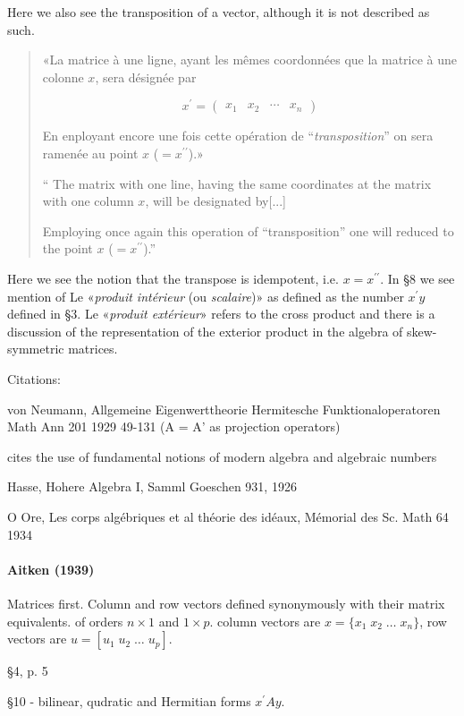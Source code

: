Here we also see the transposition of a vector, although it is not described as such.
\begin{quote}
«La matrice à une ligne, ayant les mêmes coordonnées que la matrice à une colonne $x$, sera désignée par

\[
x^\prime = \begin{pmatrix}x_1 & x_2 & \cdots & x_n\end{pmatrix}
\]

En enployant encore une fois cette opération de ``\textit{transposition}'' on sera ramenée au point $x$ ($= x^{\prime\prime}$).»

``
The matrix with one line, having the same coordinates at the matrix with one column $x$, will be designated by[...]

Employing once again this operation of ``transposition'' one will reduced to the point $x$ ($= x^{\prime\prime}$).''

\end{quote}
Here we see the notion that the transpose is idempotent, i.e. $x = x^{\prime\prime}$.
In \S 8 we see mention of Le «\textit{produit intérieur} (ou \textit{scalaire})» as defined as the number $x^\prime y$ defined in \S 3. Le «\textit{produit extérieur}» refers to the cross product and there is a discussion of the representation of the exterior product in the algebra of skew-symmetric matrices.

Citations:

von Neumann, Allgemeine Eigenwerttheorie Hermitesche Funktionaloperatoren
Math Ann 201 1929 49-131 (A = A' as projection operators)

cites the use of fundamental notions of modern algebra and algebraic numbers

Hasse, Hohere Algebra I, Samml  Goeschen 931, 1926

O Ore, Les corps algébriques et al théorie des idéaux, Mémorial des Sc. Math 64 1934


\paragraph{Aitken (1939)~\cite{Aitken1939}}

Matrices first. Column and row vectors defined synonymously with their matrix equivalents.
of orders $n\times1$ and $1\times p$.
column vectors are $x = \{x_1\;x_2\;\dots\;x_n\}$,
row vectors are $u = [u_1\;u_2\;\dots\;u_p]$.

\S 4, p. 5

\S 10 - bilinear, qudratic and Hermitian forms $x^\prime A y$.

